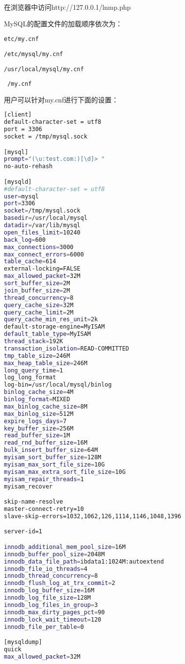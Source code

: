 在浏览器中访问http://127.0.0.1/lnmp.php




MySQL的配置文件的加载顺序依次为：

\begin{compactitem}
\item \texttt{etc/my.cnf}
\item \texttt{/etc/mysql/my.cnf}
\item \texttt{/usr/local/mysql/my.cnf}
\item \texttt{~/my.cnf}
\end{compactitem}

用户可以针对my.cnf进行下面的设置：


\begin{lstlisting}[language=bash]
[client]
default-character-set = utf8
port = 3306
socket = /tmp/mysql.sock

[mysql]
prompt="(\u:test.com:)[\d]> "
no-auto-rehash

[mysqld]
#default-character-set = utf8
user=mysql
port=3306
socket=/tmp/mysql.sock
basedir=/usr/local/mysql
datadir=/var/lib/mysql
open_files_limit=10240
back_log=600
max_connections=3000
max_connect_errors=6000
table_cache=614
external-locking=FALSE
max_allowed_packet=32M
sort_buffer_size=2M
join_buffer_size=2M
thread_concurrency=8
query_cache_size=32M
query_cache_limit=2M
query_cache_min_res_unit=2k
default-storage-engine=MyISAM
default_table_type=MyISAM
thread_stack=192K
transaction_isolation=READ-COMMITTED
tmp_table_size=246M
max_heap_table_size=246M
long_query_time=1
log_long_format
log-bin=/usr/local/mysql/binlog
binlog_cache_size=4M
binlog_format=MIXED
max_binlog_cache_size=8M
max_binlog_size=512M
expire_logs_days=7
key_buffer_size=256M
read_buffer_size=1M
read_rnd_buffer_size=16M
bulk_insert_buffer_size=64M
myisam_sort_buffer_size=128M
myisam_max_sort_file_size=10G
myisam_max_extra_sort_file_size=10G
myisam_repair_threads=1
myisam_recover

skip-name-resolve
master-connect-retry=10
slave-skip-errors=1032,1062,126,1114,1146,1048,1396

server-id=1

innodb_additional_mem_pool_size=16M
innodb_buffer_pool_size=2048M
innodb_data_file_path=ibdata1:1024M:autoextend
innodb_file_io_threads=4
innodb_thread_concurrency=8
innodb_flush_log_at_trx_commit=2
innodb_log_buffer_size=16M
innodb_log_file_size=128M
innodb_log_files_in_group=3
innodb_max_dirty_pages_pct=90
innodb_lock_wait_timeout=120
innodb_file_per_table=0

[mysqldump]
quick
max_allowed_packet=32M
\end{lstlisting}






